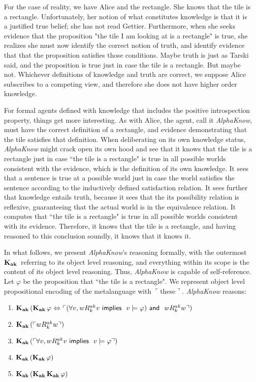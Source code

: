 For the case of reality, we have Alice and the rectangle. She knows that the tile is a rectangle. Unfortunately, her notion of what constitutes knowledge is that it is a justified true belief; she has not read Gettier. Furthermore, when she seeks evidence that the proposition "the tile I am looking at is a rectangle" is true, she realizes she must now identify the correct notion of truth, and identify evidence that that the proposition satisfies those conditions. Maybe truth is just as Tarski said, and the proposition is true just in case the tile is a rectangle. But maybe not. Whichever definitions of knowledge and truth are correct, we suppose Alice subscribes to a competing view, and therefore she does not have higher order knowledge.

For formal agents defined with knowledge that includes the positive introspection property, things get more interesting. As with Alice, the agent, call it \emph{AlphaKnow}, must have the correct definition of a rectangle, and evidence demonstrating that the tile satisfies that definition. When deliberating on its own knowledge status, \emph{AlphaKnow} might crack open its own hood and see that it knows that the tile is a rectangle just in case ``the tile is a rectangle" is true in all possible worlds consistent with the evidence, which is the definition of its own knowledge. It sees that a sentence is true at a possible world just in case the world satisfies the sentence according to the inductively defined satisfaction relation. It sees further that knowledge entails truth, because it sees that the its possibility relation is reflexive, guaranteeing that the actual world is in the equivalence relation. It computes that ``the tile is a rectangle" is true in all possible worlds consistent with its evidence. Therefore, it knows that the tile is a rectangle, and having reasoned to this conclusion soundly, it knows that it knows it.

In what follows, we present \emph{AlphaKnow}'s reasoning formally, with the outermost $\mathbf{K}_{\mathbf{ak}}\,$ referring to its object level reasoning, and everything within its scope is the content of its object level reasoning. Thus, \emph{AlphaKnow} is capable of self-reference. Let $\varphi$ be the proposition that ``the tile is a rectangle".  We represent object level propositional encoding of the metalanguage with $\ulcorner$these$\urcorner$. \emph{AlphaKnow} reasons:
\begin{enumerate}
\item $\mathbf{K}_{\mathbf{ak}}\,(\mathbf{K}_{\mathbf{ak}}\,\varphi {\ \Leftrightarrow \ } \ulcorner(\forall v, wR_{k}^{ak}v \textsf{\ implies \ } v\models\varphi) \textsf{\ and \ } wR_{k}^{ak}w\urcorner)$
\item $\mathbf{K}_{\mathbf{ak}}\,(\ulcorner wR_{k}^{ak}w\urcorner)$
\item $\mathbf{K}_{\mathbf{ak}}\,(\ulcorner \forall v, wR_{k}^{ak}v \textsf{\ implies \ } v\models\varphi\urcorner)$
\item $\mathbf{K}_{\mathbf{ak}}\,(\mathbf{K}_{\mathbf{ak}}\,\varphi)$
\item $\mathbf{K}_{\mathbf{ak}}\,(\mathbf{K}_{\mathbf{ak}}\,\mathbf{K}_{\mathbf{ak}}\,\varphi)$

\end{enumerate}


